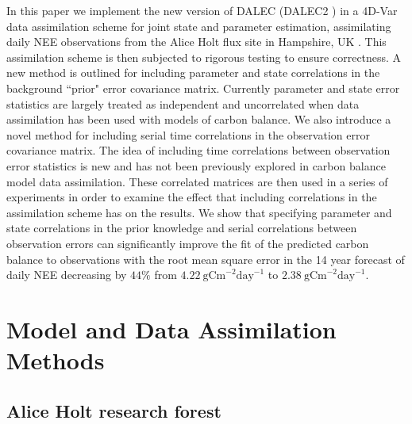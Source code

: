 \documentclass[review]{elsarticle}
\begin{document}
In this paper we implement the new version of DALEC (DALEC2 \citep{Bloom2015}) in a 4D-Var data assimilation scheme for joint state and parameter estimation, assimilating daily NEE observations from the Alice Holt flux site in Hampshire, UK \citep{wilkinson2012inter}. This assimilation scheme is then subjected to rigorous testing to ensure correctness. A new method is outlined for including parameter and state correlations in the background ``prior" error covariance matrix. Currently parameter and state error statistics are largely treated as independent and uncorrelated when data assimilation has been used with models of carbon balance. We also introduce a novel method for including serial time correlations in the observation error covariance matrix. The idea of including time correlations between observation error statistics is new and has not been previously explored in carbon balance model data assimilation. These correlated matrices are then used in a series of experiments in order to examine the effect that including correlations in the assimilation scheme has on the results. We show that specifying parameter and state correlations in the prior knowledge and serial correlations between observation errors can significantly improve the fit of the predicted carbon balance to observations with the root mean square error in the 14 year forecast of daily NEE decreasing by $44\%$ from $4.22~\text{gCm}^{-2}\text{day}^{-1}$ to $2.38~\text{gCm}^{-2}\text{day}^{-1}$.

\section{Model and Data Assimilation Methods}

\subsection{Alice Holt research forest}
\end{document}
